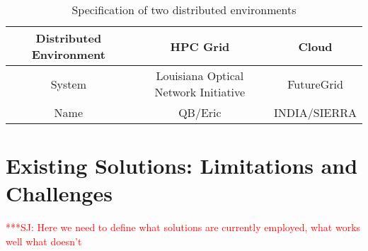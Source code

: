 \documentclass[12pt]{article}
\newcommand{\jhanote}[1]{ {\textcolor{red}     {***SJ: #1}}}
\newcommand{\jhanote}[1]{}
\begin{document}
 \begin{table}
 \begin{tabular}{|c|cc|} 
 \hline 
Distributed Environment &  HPC Grid &  Cloud \\ \hline
System  &  Louisiana Optical Network Initiative & FutureGrid \\
Name &  QB/Eric   &  INDIA/SIERRA \\
 \hline
 \end{tabular}

 \caption{Specification of two distributed environments}
 \label{table:two-systems} 
 \end{table}




\section{Existing Solutions: Limitations and Challenges}

\jhanote{Here we need to define what solutions are currently employed, what works well
  what doesn't}
\end{document}
